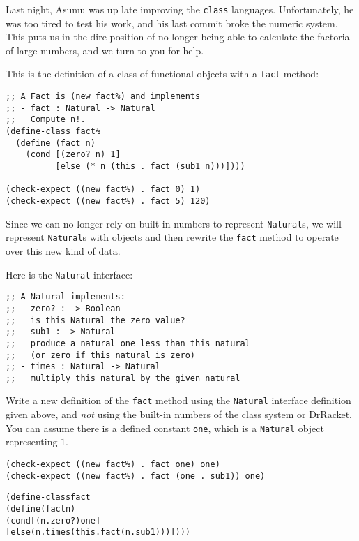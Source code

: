 \documentclass[12pt]{article}                   %
\def\pts#1{\marginpar{\footnotesize \raggedright  \fbox{#1 {\sc Points}}}}
\newenvironment{solution}{\color{Red}}{}
\begin{document}
\begin{problem} \pts{18}
Last night, Asumu was up late improving the {\tt class} languages.
Unfortunately, he was too tired to test his work, and his last commit
broke the numeric system.
%
This puts us in the dire position of no longer being able to calculate
the factorial of large numbers, and we turn to you for help.

This is the definition of a class of functional objects
with a {\tt fact} method:

\begin{verbatim}
;; A Fact is (new fact%) and implements 
;; - fact : Natural -> Natural
;;   Compute n!.
(define-class fact%
  (define (fact n)
    (cond [(zero? n) 1]
          [else (* n (this . fact (sub1 n)))])))

(check-expect ((new fact%) . fact 0) 1)
(check-expect ((new fact%) . fact 5) 120)
\end{verbatim}

Since we can no longer rely on built in numbers to represent
\verb|Natural|s, we will represent \verb|Natural|s with objects and
then rewrite the \verb|fact| method to operate over this new kind of
data.

Here is the \verb|Natural| interface:

\begin{verbatim}
;; A Natural implements:
;; - zero? : -> Boolean
;;   is this Natural the zero value?
;; - sub1 : -> Natural
;;   produce a natural one less than this natural 
;;   (or zero if this natural is zero)
;; - times : Natural -> Natural
;;   multiply this natural by the given natural
\end{verbatim}

\newpage
Write a new definition of the \verb|fact| method using the
\verb|Natural| interface definition given above, and \emph{not} using
the built-in numbers of the class system or DrRacket.  You can assume
there is a defined constant \verb|one|, which is a \verb|Natural|
object representing $1$.

\begin{verbatim}
(check-expect ((new fact%) . fact one) one)
(check-expect ((new fact%) . fact (one . sub1)) one)
\end{verbatim}


\begin{solution}
\begin{alltt}
(define-class fact%
  (define (fact n)
    (cond [(n . zero?) one]
          [else (n . times (this . fact (n . sub1)))])))


\end{alltt}
\end{solution}
\end{problem}
\end{document}
